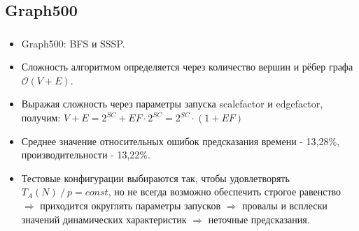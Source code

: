 \documentclass[unicode, t, 11pt]{beamer}%
\begin{document}
		\subsection{Graph500}
		\begin{frame}
			\frametitle{\insertsection}
			\framesubtitle{\insertsubsection}
			\begin{itemize}[label = \(\bullet\)]
				\item Graph500: BFS и SSSP.
				\item Сложность алгоритмом определяется через количество вершин и рёбер графа \(\mathcal{O}(V + E)\).
				\item Выражая сложность через параметры запуска scalefactor и edgefactor, получим: \(V + E = 2^{SC} + EF \cdot 2^{SC} = 2^{SC} \cdot (1 + EF) \)
				\item Среднее значение относительных ошибок предсказания времени - 13,28\%, производительности - 13,22\%.
				\item Тестовые конфигурации выбираются так, чтобы удовлетворять \(T_A(N)\:/\:p = const\), но не всегда возможно обеспечить строгое равенство \(\Rightarrow\) приходится округлять параметры запусков \(\Rightarrow\) провалы и всплески значений динамических характеристик \(\Rightarrow\) неточные предсказания.
			\end{itemize}

		\end{frame}
\end{document}

